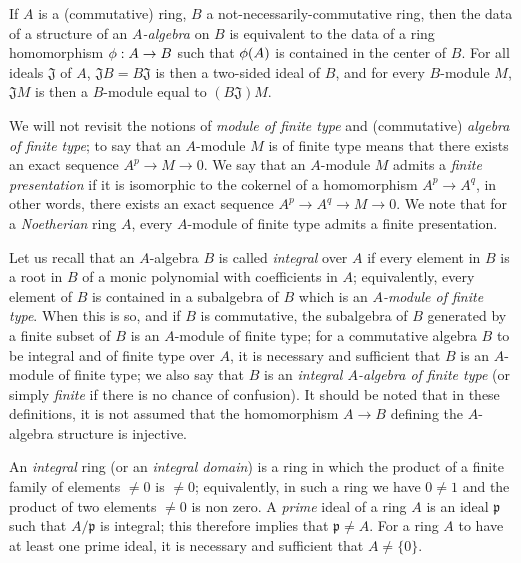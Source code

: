 \begin{env}[1.0.4]
\label{0.1.0.4}
If $A$ is a (commutative) ring, $B$ a not-necessarily-commutative ring, then the data
of a structure of an {\em $A$-algebra} on $B$ is equivalent to the data of a
ring homomorphism $\phi:A\to B$ such that $\phi(A)$ is contained in the center
of $B$. For all ideals $\mathfrak{J}$ of $A$, $\mathfrak{J}B=B\mathfrak{J}$ is
then a two-sided ideal of $B$, and for every $B$-module $M$, $\mathfrak{J}M$ is
then a $B$-module equal to $(B\mathfrak{J})M$.
\end{env}

\begin{env}[1.0.5]
\label{0.1.0.5}
We will not revisit the notions of {\em module of finite type} and
(commutative) {\em algebra of finite type}; to say that an $A$-module $M$ is of
finite type means that there exists
an exact sequence $A^p\to M\to 0$. We say that an $A$-module $M$ admits a
{\em finite presentation} if it is isomorphic to the cokernel of a homomorphism
$A^p\to A^q$, in other words, there exists an exact sequence
$A^p\to A^q\to M\to 0$. We note that for a {\em Noetherian} ring $A$, every
$A$-module of finite type admits a finite presentation.

Let us recall that an $A$-algebra $B$ is called {\em integral} over $A$ if
every element in $B$ is a root in $B$ of a monic polynomial with coefficients in
$A$; equivalently, every element of $B$ is contained in a subalgebra of $B$
which is an {\em $A$-module of finite type}. When this is so, and if $B$ is
commutative, the subalgebra of $B$ generated by a finite subset of $B$ is an
$A$-module of finite type; for a commutative algebra $B$ to be integral and of
finite type over $A$, it is necessary and sufficient that $B$ is an $A$-module
of finite type; we also say that $B$ is an {\em integral $A$-algebra of finite
type} (or simply {\em finite} if there is no chance of confusion). It should be
noted that in these definitions, it is not assumed that the homomorphism
$A\to B$ defining the $A$-algebra structure is injective.
\end{env}

\begin{env}[1.0.6]
\label{0.1.0.6}
An {\em integral} ring (or an {\em integral domain}) is a ring in which the
product of a finite family of elements $\neq 0$ is $\neq 0$; equivalently, in
such a ring we have $0\neq 1$ and the product of two elements $\neq 0$ is non
zero. A {\em prime} ideal of a ring $A$ is an ideal $\mathfrak{p}$ such that
$A/\mathfrak{p}$ is integral; this therefore implies that $\mathfrak{p}\neq A$.
For a ring $A$ to have at least one prime ideal, it is necessary and sufficient
that $A\neq\{0\}$.
\end{env}

